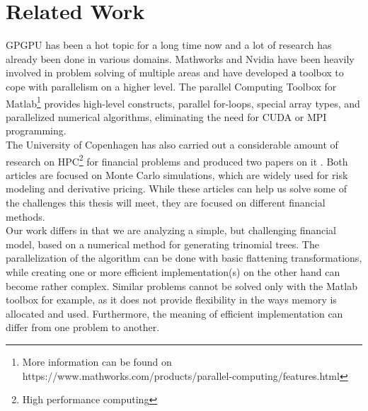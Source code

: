 \section{Related Work}
\label{section:relatedwork}
GPGPU has been a hot topic for a long time now and a lot of research has already been done in various domains. Mathworks and Nvidia have been heavily involved in problem solving of multiple areas and have developed а toolbox to cope with parallelism on a higher level. The parallel Computing Toolbox for Matlab\footnote{More information can be found on https://www.mathworks.com/products/parallel-computing/features.html} provides high-level constructs, parallel for-loops, special array types, and parallelized numerical algorithms, eliminating the need for CUDA or MPI programming. \\
The University of Copenhagen has also carried out a considerable amount of research on HPC\footnote{High performance computing} for financial problems and produced two papers on it\cite{FinPar:TACO} \cite{LexiFiPricing}. Both articles are focused on Monte Carlo simulations, which are widely used for risk modeling and derivative pricing. While these articles can help us solve some of the challenges this thesis will meet, they are focused on different financial methods.\\
Our work differs in that we are analyzing a simple, but challenging financial model, based on a numerical method for generating trinomial trees. The parallelization of the algorithm can be done with basic flattening transformations, while creating one or more efficient implementation(s) on the other hand can become rather complex. Similar problems cannot be solved only with the Matlab toolbox for example, as it does not provide flexibility in the ways memory is allocated and used. Furthermore, the meaning of efficient implementation can differ from one problem to another. 


